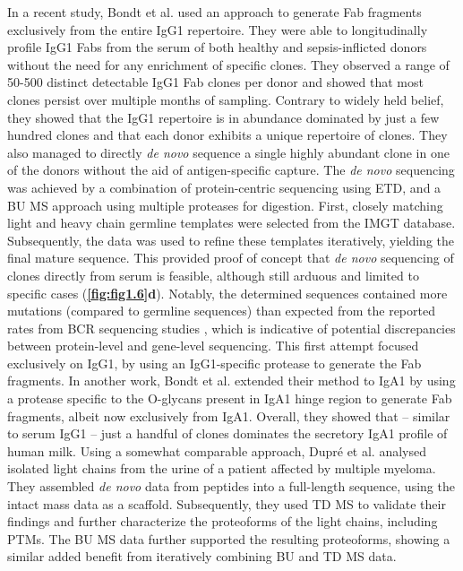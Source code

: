 In a recent study, Bondt et al. \cite{bondt2021human} used an approach to generate Fab fragments exclusively from the entire IgG1 repertoire. They were able to longitudinally profile IgG1 Fabs from the serum of both healthy and sepsis-inflicted donors without the need for any enrichment of specific clones. They observed a range of 50-500 distinct detectable IgG1 Fab clones per donor and showed that most clones persist over multiple months of sampling. Contrary to widely held belief, they showed that the IgG1 repertoire is in abundance dominated by just a few hundred clones and that each donor exhibits a unique repertoire of clones. They also managed to directly \emph{de novo} sequence a single highly abundant clone in one of the donors without the aid of antigen-specific capture. The \emph{de novo} sequencing was achieved by a combination of protein-centric sequencing using ETD, and a BU MS approach using multiple proteases for digestion. First, closely matching light and heavy chain germline templates were selected from the IMGT database. Subsequently, the data was used to refine these templates iteratively, yielding the final mature sequence. This provided proof of concept that \emph{de novo} sequencing of clones directly from serum is feasible, although still arduous and limited to specific cases (\textbf{\autoref{fig:fig1.6}d}). Notably, the determined sequences contained more mutations (compared to germline sequences) than expected from the reported rates from BCR sequencing studies \cite{kitaura2017different}, which is indicative of potential discrepancies between protein-level and gene-level sequencing. This first attempt focused exclusively on IgG1, by using an IgG1-specific protease to generate the Fab fragments. In another work, Bondt et al. \cite{bondt2021direct} extended their method to IgA1 by using a protease specific to the O-glycans present in IgA1 hinge region to generate Fab fragments, albeit now exclusively from IgA1. Overall, they showed that – similar to serum IgG1 – just a handful of clones dominates the secretory IgA1 profile of human milk.
Using a somewhat comparable approach, Dupré et al. \cite{dupré2021de} analysed isolated light chains from the urine of a patient affected by multiple myeloma. They assembled \emph{de novo} data from peptides into a full-length sequence, using the intact mass data as a scaffold. Subsequently, they used TD MS to validate their findings and further characterize the proteoforms of the light chains, including PTMs. The BU MS data further supported the resulting proteoforms, showing a similar added benefit from iteratively combining BU and TD MS data.

